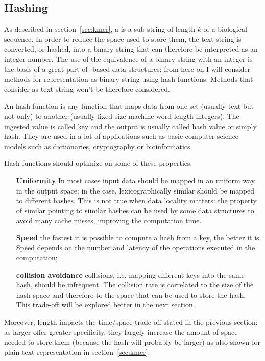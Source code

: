 \subsection{Hashing \kmers}
As described in section~\ref{sec:kmer}, a \kmer is a sub-string of length $k$ of a biological sequence. In order to reduce the space used to store them, the text string is converted, or hashed, into a binary string that can therefore be interpreted as an integer number. The use of the equivalence of a binary string with an integer is the basis of a great part of \kmer-based data structures: from here on I will consider methods for \kmers representation as binary string using hash functions. Methods that consider \kmer as text string won't be therefore considered.
\begin{description}
	\item An hash function is any function that maps data from one set (usually text but not only) to another (usually fixed-size machine-word-length integers). The ingested value is called key and the output is usually called hash value or simply hash. They are used in a lot of applications such as basic computer science models such as dictionaries, cryptography or bioinformatics.
	\item Hash functions should optimize on some of these properties:
	\begin{itemize}
		\item[\textbf{Uniformity}] In most cases input data should be mapped in an uniform way in the output space: in the \kmer case, lexicographically similar \kmers should be mapped to different hashes. This is not true when data locality matters: the property of similar \kmers pointing to similar hashes can be used by some data structures to avoid many cache misses, improving the computation time.
		\item[\textbf{Speed}] the fastest it is possible to compute a hash from a key, the better it is. Speed depends on the number and latency of the operations executed in the computation;
		\item[\textbf{collision avoidance}] collisions, i.e. mapping different keys into the same hash, should be infrequent. The collision rate is correlated to the size of the hash space and therefore to the space that can be used to store the hash. This trade-off will be explored better in the next section.
	\end{itemize}
\end{description}
Moreover, \kmer length impacts the time/space trade-off stated in the previous section: as larger \kmer offer greater specificity, they largely increase the amount of space needed to store them (because the hash will probably be larger) as also shown for plain-text representation in section~\ref{sec:kmer}.

